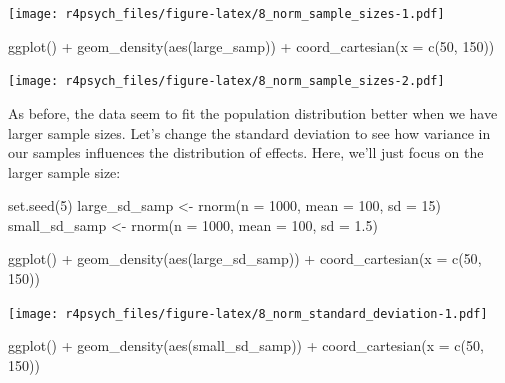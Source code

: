 \documentclass[
]{book}
\newenvironment{Shaded}{\begin{snugshade}}{\end{snugshade}}
\newcommand{\AttributeTok}[1]{\textcolor[rgb]{0.77,0.63,0.00}{#1}}
\newcommand{\DecValTok}[1]{\textcolor[rgb]{0.00,0.00,0.81}{#1}}
\newcommand{\FloatTok}[1]{\textcolor[rgb]{0.00,0.00,0.81}{#1}}
\newcommand{\FunctionTok}[1]{\textcolor[rgb]{0.00,0.00,0.00}{#1}}
\newcommand{\NormalTok}[1]{#1}
\newcommand{\OtherTok}[1]{\textcolor[rgb]{0.56,0.35,0.01}{#1}}
\newcommand{\SpecialCharTok}[1]{\textcolor[rgb]{0.00,0.00,0.00}{#1}}
\begin{document}
\texttt{[image: r4psych\_files/figure-latex/8\_norm\_sample\_sizes-1.pdf]}

\begin{Shaded}
\begin{Highlighting}[]
\FunctionTok{ggplot}\NormalTok{() }\SpecialCharTok{+} \FunctionTok{geom\_density}\NormalTok{(}\FunctionTok{aes}\NormalTok{(large\_samp)) }\SpecialCharTok{+} \FunctionTok{coord\_cartesian}\NormalTok{(}\AttributeTok{x =} \FunctionTok{c}\NormalTok{(}\DecValTok{50}\NormalTok{, }\DecValTok{150}\NormalTok{))}
\end{Highlighting}
\end{Shaded}

\texttt{[image: r4psych\_files/figure-latex/8\_norm\_sample\_sizes-2.pdf]}

As before, the data seem to fit the population distribution better when we have larger sample sizes. Let's change the standard deviation to see how variance in our samples influences the distribution of effects. Here, we'll just focus on the larger sample size:

\begin{Shaded}
\begin{Highlighting}[]
\FunctionTok{set.seed}\NormalTok{(}\DecValTok{5}\NormalTok{)}
\NormalTok{large\_sd\_samp }\OtherTok{\textless{}{-}} \FunctionTok{rnorm}\NormalTok{(}\AttributeTok{n =} \DecValTok{1000}\NormalTok{, }\AttributeTok{mean =} \DecValTok{100}\NormalTok{, }\AttributeTok{sd =} \DecValTok{15}\NormalTok{)}
\NormalTok{small\_sd\_samp }\OtherTok{\textless{}{-}} \FunctionTok{rnorm}\NormalTok{(}\AttributeTok{n =} \DecValTok{1000}\NormalTok{, }\AttributeTok{mean =} \DecValTok{100}\NormalTok{, }\AttributeTok{sd =} \FloatTok{1.5}\NormalTok{)}

\FunctionTok{ggplot}\NormalTok{() }\SpecialCharTok{+} \FunctionTok{geom\_density}\NormalTok{(}\FunctionTok{aes}\NormalTok{(large\_sd\_samp)) }\SpecialCharTok{+} \FunctionTok{coord\_cartesian}\NormalTok{(}\AttributeTok{x =} \FunctionTok{c}\NormalTok{(}\DecValTok{50}\NormalTok{, }\DecValTok{150}\NormalTok{))}
\end{Highlighting}
\end{Shaded}

\texttt{[image: r4psych\_files/figure-latex/8\_norm\_standard\_deviation-1.pdf]}

\begin{Shaded}
\begin{Highlighting}[]
\FunctionTok{ggplot}\NormalTok{() }\SpecialCharTok{+} \FunctionTok{geom\_density}\NormalTok{(}\FunctionTok{aes}\NormalTok{(small\_sd\_samp)) }\SpecialCharTok{+} \FunctionTok{coord\_cartesian}\NormalTok{(}\AttributeTok{x =} \FunctionTok{c}\NormalTok{(}\DecValTok{50}\NormalTok{, }\DecValTok{150}\NormalTok{))}
\end{Highlighting}
\end{Shaded}
\end{document}
